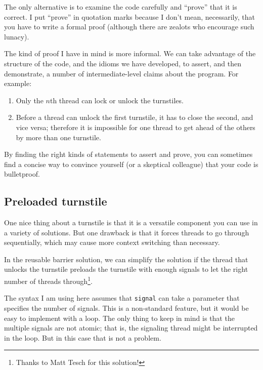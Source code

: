 \documentclass{book}
\newcommand{\clearemptydoublepage}{\newpage\cleardoublepage}
\begin{document}
The only alternative is to examine the code carefully and
``prove'' that it is correct.  I put ``prove'' in quotation
marks because I don't mean, necessarily, that you have to write
a formal proof (although there are zealots who encourage
such lunacy).

The kind of proof I have in mind is more informal.  We can take
advantage of the structure of the code, and the idioms we have
developed, to assert, and then demonstrate, a number of
intermediate-level claims about the program.  For example:

\begin{enumerate}

\item Only the $n$th thread can lock or unlock the turnstiles.

\item Before a thread can unlock the first turnstile, it has to close 
the second, and vice versa; therefore it is impossible for one thread
to get ahead of the others by more than one turnstile.

\end{enumerate}

By finding the right kinds of statements to assert and
prove, you can sometimes find a concise way to convince yourself
(or a skeptical colleague) that your code is bulletproof.



\clearemptydoublepage
\subsection {Preloaded turnstile}

One nice thing about a turnstile is that it is a versatile
component you can use in a variety of solutions.  But one
drawback is that it forces threads to go through sequentially,
which may cause more context switching than necessary.

In the reusable barrier solution, we can simplify the solution if the
thread that unlocks the turnstile preloads the turnstile with enough
signals to let the right number of threads through\footnote{Thanks to
Matt Tesch for this solution!}.

The syntax I am using here assumes that {\tt signal} can take a
parameter that specifies the number of signals.  This is a
non-standard feature, but it would be easy to implement with a loop.
The only thing to keep in mind is that the multiple signals are not
atomic; that is, the signaling thread might be interrupted in the
loop.  But in this case that is not a problem.
\end{document}
